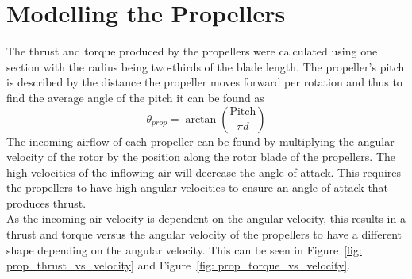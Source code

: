     \section{Modelling the Propellers}
        The thrust and torque produced by the propellers were calculated using one section with the radius being two-thirds of the blade length. The propeller’s pitch is described by the distance the propeller moves forward per rotation and thus to find the average angle of the pitch it can be found as\[\theta_{prop} = \arctan\left(\frac{\text{Pitch}}{\pi d}\right)\]
        The incoming airflow of each propeller can be found by multiplying the angular velocity of the rotor by the position along the rotor blade of the propellers. The high velocities of the inflowing air will decrease the angle of attack. This requires the propellers to have high angular velocities to ensure an angle of attack that produces thrust.
        \\
        As the incoming air velocity is dependent on the angular velocity, this results in a thrust and torque versus the angular velocity of the propellers to have a different shape depending on the angular velocity. This can be seen in  Figure~\ref{fig: prop_thrust_vs_velocity} and Figure~\ref{fig: prop_torque_vs_velocity}. 

